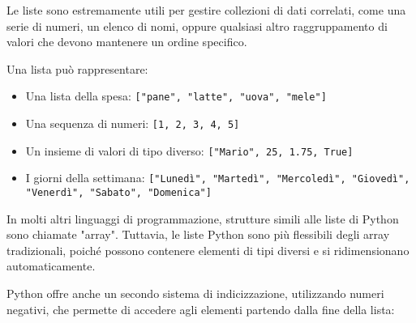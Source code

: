 Le liste sono estremamente utili per gestire collezioni di dati correlati, come una serie di numeri, un elenco di nomi, oppure qualsiasi altro raggruppamento di valori che devono mantenere un ordine specifico.

\begin{esempio}
Una lista può rappresentare:
\begin{itemize}
    \item Una lista della spesa: \texttt{["pane", "latte", "uova", "mele"]}
    \item Una sequenza di numeri: \texttt{[1, 2, 3, 4, 5]}
    \item Un insieme di valori di tipo diverso: \texttt{["Mario", 25, 1.75, True]}
    \item I giorni della settimana: \texttt{["Lunedì", "Martedì", "Mercoledì", "Giovedì", "Venerdì", "Sabato", "Domenica"]}
\end{itemize}
\end{esempio}

\begin{nota}
In molti altri linguaggi di programmazione, strutture simili alle liste di Python sono chiamate "array". Tuttavia, le liste Python sono più flessibili degli array tradizionali, poiché possono contenere elementi di tipi diversi e si ridimensionano automaticamente.
\end{nota}

\begin{center}
\end{center}


Python offre anche un secondo sistema di indicizzazione, utilizzando numeri negativi, che permette di accedere agli elementi partendo dalla fine della lista:\\

